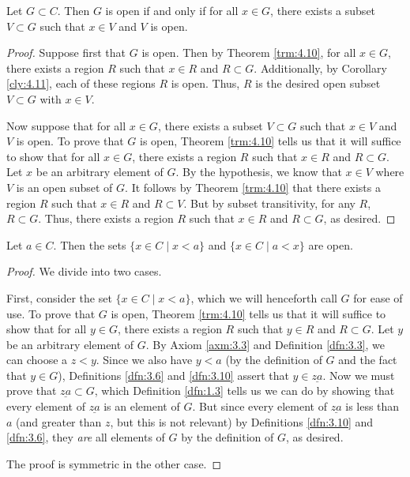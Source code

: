 \documentclass[../main.tex]{subfiles}
\begin{document}
\begin{corollary}\label{cly:4.12}
    Let $G\subset C$. Then $G$ is open if and only if for all $x\in G$, there exists a subset $V\subset G$ such that $x\in V$ and $V$ is open.
    \begin{proof}
        Suppose first that $G$ is open. Then by Theorem \ref{trm:4.10}, for all $x\in G$, there exists a region $R$ such that $x\in R$ and $R\subset G$. Additionally, by Corollary \ref{cly:4.11}, each of these regions $R$ is open. Thus, $R$ is the desired open subset $V\subset G$ with $x\in V$.\par
        Now suppose that for all $x\in G$, there exists a subset $V\subset G$ such that $x\in V$ and $V$ is open. To prove that $G$ is open, Theorem \ref{trm:4.10} tells us that it will suffice to show that for all $x\in G$, there exists a region $R$ such that $x\in R$ and $R\subset G$. Let $x$ be an arbitrary element of $G$. By the hypothesis, we know that $x\in V$ where $V$ is an open subset of $G$. It follows by Theorem \ref{trm:4.10} that there exists a region $R$ such that $x\in R$ and $R\subset V$. But by subset transitivity, for any $R$, $R\subset G$. Thus, there exists a region $R$ such that $x\in R$ and $R\subset G$, as desired.
    \end{proof}
\end{corollary}

\begin{corollary}\label{cly:4.13}
    Let $a\in C$. Then the sets $\{x\in C\mid x<a\}$ and $\{x\in C\mid a<x\}$ are open.
    \begin{proof}
        We divide into two cases.\par
        First, consider the set $\{x\in C\mid x<a\}$, which we will henceforth call $G$ for ease of use. To prove that $G$ is open, Theorem \ref{trm:4.10} tells us that it will suffice to show that for all $y\in G$, there exists a region $R$ such that $y\in R$ and $R\subset G$. Let $y$ be an arbitrary element of $G$. By Axiom \ref{axm:3.3} and Definition \ref{dfn:3.3}, we can choose a $z<y$. Since we also have $y<a$ (by the definition of $G$ and the fact that $y\in G$), Definitions \ref{dfn:3.6} and \ref{dfn:3.10} assert that $y\in\underline{za}$. Now we must prove that $\underline{za}\subset G$, which Definition \ref{dfn:1.3} tells us we can do by showing that every element of $\underline{za}$ is an element of $G$. But since every element of $\underline{za}$ is less than $a$ (and greater than $z$, but this is not relevant) by Definitions \ref{dfn:3.10} and \ref{dfn:3.6}, they \emph{are} all elements of $G$ by the definition of $G$, as desired.\par
        The proof is symmetric in the other case.
    \end{proof}
\end{corollary}
\end{document}
